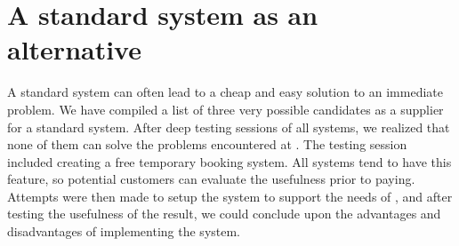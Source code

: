 \section{A standard system as an alternative}
A standard system can often lead to a cheap and easy solution to an immediate
problem.  We have compiled a list of three very possible candidates as a
supplier for a standard system.  After deep testing sessions of all systems, we
realized that none of them can solve the problems encountered at \gomonkey{}.
The testing session included creating a free temporary booking system. All
systems tend to have this feature, so potential customers can evaluate the
usefulness prior to paying. Attempts were then made to setup the system to
support the needs of \gomonkey{}, and after testing the usefulness of the
result, we could conclude upon the advantages and disadvantages of implementing
the system.

